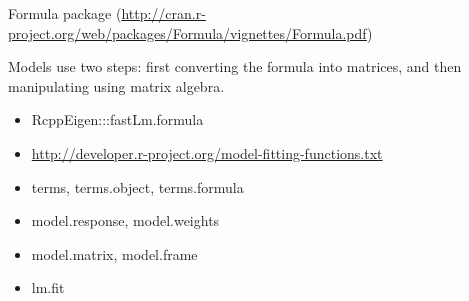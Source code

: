 Formula package
(\url{http://cran.r-project.org/web/packages/Formula/vignettes/Formula.pdf})

Models use two steps: first converting the formula into matrices, and
then manipulating using matrix algebra.

\begin{itemize}
\item
  RcppEigen:::fastLm.formula
\item
  \url{http://developer.r-project.org/model-fitting-functions.txt}
\item
  terms, terms.object, terms.formula
\item
  model.response, model.weights
\item
  model.matrix, model.frame
\item
  lm.fit
\end{itemize}
